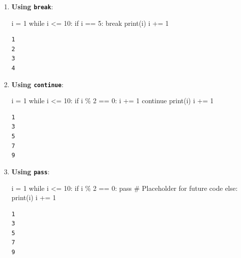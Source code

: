 \documentclass[
  letterpaper,
  DIV=11,
  numbers=noendperiod]{scrreprt}
\newenvironment{Shaded}{\begin{snugshade}}{\end{snugshade}}
\newcommand{\BuiltInTok}[1]{\textcolor[rgb]{0.00,0.23,0.31}{#1}}
\newcommand{\CommentTok}[1]{\textcolor[rgb]{0.37,0.37,0.37}{#1}}
\newcommand{\ControlFlowTok}[1]{\textcolor[rgb]{0.00,0.23,0.31}{#1}}
\newcommand{\DecValTok}[1]{\textcolor[rgb]{0.68,0.00,0.00}{#1}}
\newcommand{\NormalTok}[1]{\textcolor[rgb]{0.00,0.23,0.31}{#1}}
\newcommand{\OperatorTok}[1]{\textcolor[rgb]{0.37,0.37,0.37}{#1}}
\begin{document}
\begin{enumerate}
\def\labelenumi{\arabic{enumi}.}
\item
  \textbf{Using \texttt{break}}:

\begin{Shaded}
\begin{Highlighting}[]
\NormalTok{i }\OperatorTok{=} \DecValTok{1}
\ControlFlowTok{while}\NormalTok{ i }\OperatorTok{\textless{}=} \DecValTok{10}\NormalTok{:}
    \ControlFlowTok{if}\NormalTok{ i }\OperatorTok{==} \DecValTok{5}\NormalTok{:}
        \ControlFlowTok{break}
    \BuiltInTok{print}\NormalTok{(i)}
\NormalTok{    i }\OperatorTok{+=} \DecValTok{1}
\end{Highlighting}
\end{Shaded}

\begin{verbatim}
1
2
3
4
\end{verbatim}
\item
  \textbf{Using \texttt{continue}}:

\begin{Shaded}
\begin{Highlighting}[]
\NormalTok{i }\OperatorTok{=} \DecValTok{1}
\ControlFlowTok{while}\NormalTok{ i }\OperatorTok{\textless{}=} \DecValTok{10}\NormalTok{:}
    \ControlFlowTok{if}\NormalTok{ i }\OperatorTok{\%} \DecValTok{2} \OperatorTok{==} \DecValTok{0}\NormalTok{:}
\NormalTok{        i }\OperatorTok{+=} \DecValTok{1}
        \ControlFlowTok{continue}
    \BuiltInTok{print}\NormalTok{(i)}
\NormalTok{    i }\OperatorTok{+=} \DecValTok{1}
\end{Highlighting}
\end{Shaded}

\begin{verbatim}
1
3
5
7
9
\end{verbatim}
\item
  \textbf{Using \texttt{pass}}:

\begin{Shaded}
\begin{Highlighting}[]
\NormalTok{i }\OperatorTok{=} \DecValTok{1}
\ControlFlowTok{while}\NormalTok{ i }\OperatorTok{\textless{}=} \DecValTok{10}\NormalTok{:}
    \ControlFlowTok{if}\NormalTok{ i }\OperatorTok{\%} \DecValTok{2} \OperatorTok{==} \DecValTok{0}\NormalTok{:}
        \ControlFlowTok{pass}  \CommentTok{\# Placeholder for future code}
    \ControlFlowTok{else}\NormalTok{:}
        \BuiltInTok{print}\NormalTok{(i)}
\NormalTok{    i }\OperatorTok{+=} \DecValTok{1}
\end{Highlighting}
\end{Shaded}

\begin{verbatim}
1
3
5
7
9
\end{verbatim}
\end{enumerate}
\end{document}

